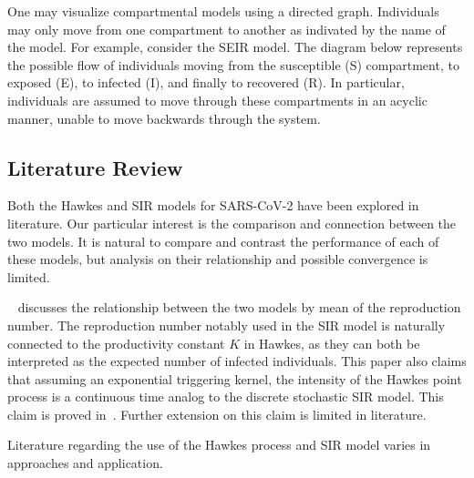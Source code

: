 \documentclass[12pt]{article}
\begin{document}
One may visualize compartmental models using a directed graph. Individuals may only move from one compartment to another as indivated by the name of the model. For example, consider the SEIR model. The diagram below represents the possible flow of individuals moving from the susceptible (S) compartment, to exposed (E), to infected (I), and finally to recovered (R). In particular, individuals are assumed to move through these compartments in an acyclic manner, unable to move backwards through the system. 

\begin{center}
  \end{center}








\subsection{Literature Review}

Both the Hawkes and SIR models for SARS-CoV-2 have been explored in literature. Our particular interest is the comparison and connection between the two models. It is natural to compare and contrast the performance of each of these models, but analysis on their relationship and possible convergence is limited. 

~\cite{Kresin2022} discusses the relationship between the two models by mean of the reproduction number. The reproduction number notably used in the SIR model is naturally connected to the productivity constant $K$ in Hawkes, as they can both be interpreted as the expected number of infected individuals. This paper also claims that assuming an exponential triggering kernel, the intensity of the Hawkes point process is a continuous time analog to the discrete stochastic SIR model. This claim is proved in~\cite{Rizoiu2018}. Further extension on this claim is limited in literature. 

Literature regarding the use of the Hawkes process and SIR model varies in approaches and application. 
\end{document}
